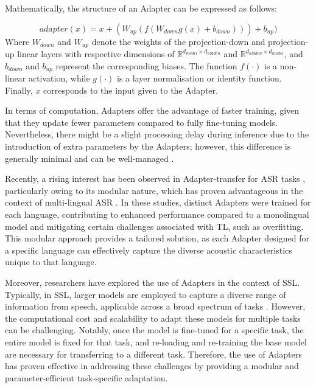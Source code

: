 Mathematically, the structure of an Adapter can be expressed as follows:

\begin{equation}
    adapter(x) = x + (W_{up}(f(W_{down}g(x)+b_{down})))+ b_{up})
\end{equation}
Where $W_{down}$ and $W_{up}$ denote the weights of the projection-down and projection-up linear layers with respective dimensions of $\mathbb{R}^{d_{model} \times d_{hidden}}$ and $\mathbb{R}^{d_{hidden} \times d_{model}}$, and $b_{down}$ and $b_{up}$ represent the corresponding biases. The function $f(\cdot)$ is a non-linear activation, while $g(\cdot)$ is a layer normalisation or identity function. Finally, $x$ corresponds to the input given to the Adapter.

In terms of computation, Adapters offer the advantage of faster training, given that they update fewer parameters compared to fully fine-tuning models. Nevertheless, there might be a slight processing delay during inference due to the introduction of extra parameters by the Adapters; however, this difference is generally minimal and can be well-managed \cite{ruckle2020adapterdrop}.

Recently, a rising interest has been observed in Adapter-transfer for \ac{ASR} tasks \cite{cappellazzo2023parameter,chen2023efficient,10095837}, particularly owing to its modular nature, which has proven advantageous in the context of multi-lingual \ac{ASR} \cite{kannan2019large, hou2021exploiting, kulkarni2023adapting}. In these studies, distinct Adapters were trained for each language, contributing to enhanced performance compared to a monolingual model and mitigating certain challenges associated with \ac{TL}, such as overfitting. This modular approach provides a tailored solution, as each Adapter designed for a specific language can effectively capture the diverse acoustic characteristics unique to that language.

Moreover, researchers have explored the use of Adapters in the context of \ac{SSL}. Typically, in \ac{SSL}, larger models are employed to capture a diverse range of information from speech, applicable across a broad spectrum of tasks \cite{thomas2022efficient, fan2022draft}. However, the computational cost and scalability to adapt these models for multiple tasks can be challenging. Notably, once the model is fine-tuned for a specific task, the entire model is fixed for that task, and re-loading and re-training the base model are necessary for transferring to a different task. Therefore, the use of Adapters has proven effective in addressing these challenges by providing a modular and parameter-efficient task-specific adaptation.

